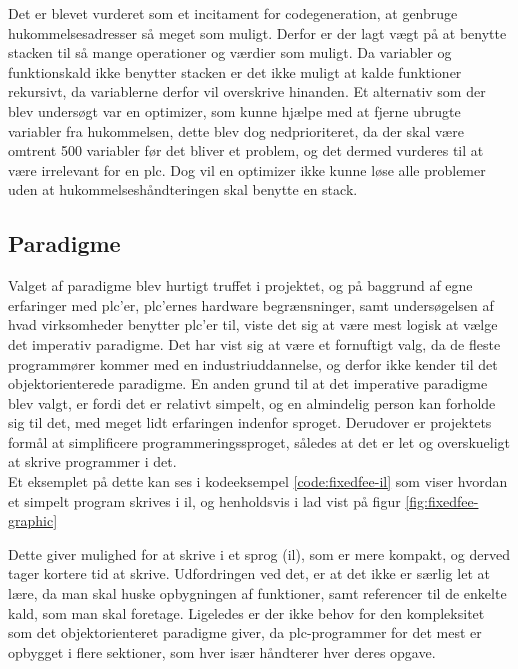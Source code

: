 \noindent Det er blevet vurderet som et incitament for codegeneration, at genbruge hukommelsesadresser så meget som muligt. Derfor er der lagt vægt på at benytte stacken til så mange operationer og værdier som muligt. Da variabler og funktionskald ikke benytter stacken er det ikke muligt at kalde funktioner rekursivt, da variablerne derfor vil overskrive hinanden.
Et alternativ som der blev undersøgt var en optimizer, som kunne hjælpe med at fjerne ubrugte variabler fra hukommelsen, dette blev dog nedprioriteret, da der skal være omtrent 500 variabler før det bliver et problem, og det dermed vurderes til at være irrelevant for en \gls{plc}. Dog vil en optimizer ikke kunne løse alle problemer uden at hukommelseshåndteringen skal benytte en stack.

\subsection*{Paradigme}
Valget af paradigme blev hurtigt truffet i projektet, og på baggrund af egne erfaringer med \gls{plc}'er, \gls{plc}'ernes hardware begrænsninger, samt undersøgelsen af hvad virksomheder benytter \gls{plc}'er til, viste det sig at være mest logisk at vælge det imperativ paradigme.
Det har vist sig at være et fornuftigt valg, da de fleste programmører kommer med en industriuddannelse, og derfor ikke kender til det objektorienterede paradigme.
En anden grund til at det imperative paradigme blev valgt, er fordi det er relativt simpelt, og en almindelig person kan forholde sig til det, med meget lidt erfaringen indenfor sproget. 
Derudover er projektets formål at simplificere programmeringssproget, således at det er let og overskueligt at skrive programmer i det.\\

\noindent Et eksemplet på dette kan ses i kodeeksempel \ref{code:fixedfee-il} som viser hvordan et simpelt program skrives i \gls{il}, og henholdsvis i \gls{lad} vist på figur \ref{fig:fixedfee-graphic}

\noindent Dette giver mulighed for at skrive i et sprog (\gls{il}), som er mere kompakt, og derved tager kortere tid at skrive. Udfordringen ved det, er at det ikke er særlig let at lære, da man skal huske opbygningen af funktioner, samt referencer til de enkelte kald, som man skal foretage.
Ligeledes er der ikke behov for den kompleksitet som det objektorienteret paradigme giver, da \gls{plc}-programmer for det mest er opbygget i flere sektioner, som hver især håndterer hver deres opgave.\\

